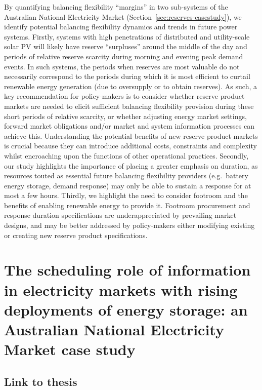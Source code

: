 \documentclass[12pt,a4paper,]{report}
\begin{document}
By quantifying balancing flexibility ``margins'' in two sub-systems of
the Australian National Electricity Market
(Section~\ref{sec:reserves-casestudy}), we identify potential balancing
flexibility dynamics and trends in future power systems. Firstly,
systems with high penetrations of distributed and utility-scale solar PV
will likely have reserve ``surpluses'' around the middle of the day and
periods of relative reserve scarcity during morning and evening peak
demand events. In such systems, the periods when reserves are most
valuable do not necessarily correspond to the periods during which it is
most efficient to curtail renewable energy generation (due to oversupply
or to obtain reserves). As such, a key recommendation for policy-makers
is to consider whether reserve product markets are needed to elicit
sufficient balancing flexibility provision during these short periods of
relative scarcity, or whether adjusting energy market settings, forward
market obligations and/or market and system information processes can
achieve this. Understanding the potential benefits of new reserve
product markets is crucial because they can introduce additional costs,
constraints and complexity whilst encroaching upon the functions of
other operational practices. Secondly, our study highlights the
importance of placing a greater emphasis on duration, as resources
touted as essential future balancing flexibility providers (e.g.~battery
energy storage, demand response) may only be able to sustain a response
for at most a few hours. Thirdly, we highlight the need to consider
footroom and the benefits of enabling renewable energy to provide it.
Footroom procurement and response duration specifications are
underappreciated by prevailing market designs, and may be better
addressed by policy-makers either modifying existing or creating new
reserve product specifications.

\hypertarget{sec:info}{%
\chapter{The scheduling role of information in electricity markets with
rising deployments of energy storage: an Australian National Electricity
Market case study}\label{sec:info}}

\hypertarget{link-to-thesis-2}{%
\section{Link to thesis}\label{link-to-thesis-2}}
\end{document}
